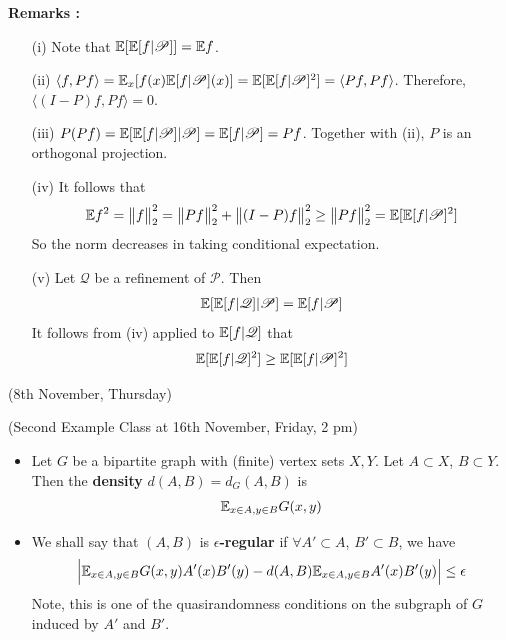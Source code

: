 \documentclass[12pt,a4paper]{report}
\begin{document}
\textbf{Remarks :}
\begin{itemize}
\item[(i)] Note that $\mathbb{E}[\mathbb{E}[f|\mathscr{P}]] = \mathbb{E} f$.
\item[(ii)] $\langle f, Pf \rangle =  \mathbb{E}_x [ f(x) \mathbb{E}[f|\mathscr{P}](x) ] = \mathbb{E} [\mathbb{E}[f|\mathscr{P}]^2 ] = \langle Pf, Pf \rangle$. Therefore, $\langle (I-P)f, Pf \rangle =0$.
\item[(iii)] $P(Pf) = \mathbb{E}[\mathbb{E}[f|\mathscr{P}]|\mathscr{P}] = \mathbb{E}[f| \mathscr{P}] = Pf$. Together with (ii), $P$ is an orthogonal projection.
\item[(iv)] It follows that
\begin{align*}
\mathbb{E} f^2 = \bigl\lVert f\bigr\rVert_{2}^2 = \bigl\lVert Pf\bigr\rVert_{2}^2 + \bigl\lVert(I-P)f\bigr\rVert_{2}^2 \geq \bigl\lVert Pf\bigr\rVert_{2}^2 = \mathbb{E}[\mathbb{E}[f|\mathscr{P}]^2]
\end{align*}
So the norm decreases in taking conditional expectation.
\item[(v)] Let $\mathscr{Q}$ be a refinement of $\mathscr{P}$. Then
\begin{align*}
\mathbb{E}[\mathbb{E}[f|\mathscr{Q}]|\mathscr{P}] = \mathbb{E}[f| \mathscr{P}]
\end{align*}
It follows from (iv) applied to $\mathbb{E}[f|\mathscr{Q}]$ that
\begin{align*}
\mathbb{E}[\mathbb{E}[f|\mathscr{Q}]^2 ] \geq \mathbb{E} [ \mathbb{E}[f|\mathscr{P}]^2 ]
\end{align*}
\end{itemize}
\s

\newday

(8th November, Thursday)
\s

(Second Example Class at 16th November, Friday, 2 pm)
\s

\begin{itemize}
\item Let $G$ be a bipartite graph with (finite) vertex sets $X,Y$. Let $A\subset X$, $B\subset Y$. Then the \textbf{density} $d(A,B)=d_G(A,B)$ is
\begin{align*}
\mathbb{E}_{x\in A, y\in B} G(x,y)
\end{align*}
\item We shall say that $(A,B)$ is \textbf{$\epsilon$-regular} if $\forall A' \subset A$, $B'\subset B$, we have
\begin{align*}
\Big| \mathbb{E}_{x\in A, y\in B} G(x,y) A'(x) B'(y) - d(A,B)\mathbb{E}_{x\in A, y\in B}A'(x)B'(y) \Big| \leq \epsilon
\end{align*}
Note, this is one of the quasirandomness conditions on the subgraph of $G$ induced by $A'$ and $B'$.
\end{itemize}
\s
\end{document}
